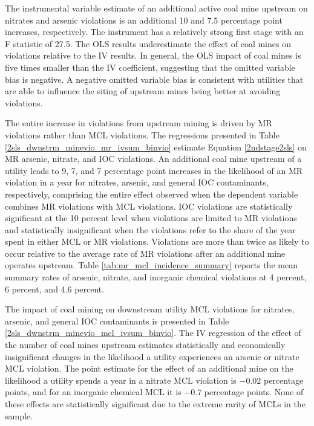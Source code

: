 \documentclass[12pt]{article}
\begin{document}
The instrumental variable estimate of an additional active coal mine upstream on nitrates and arsenic violations is an additional 10 and 7.5 percentage point increases, respectively. The instrument has a relatively strong first stage with an F statistic of 27.5. The OLS results underestimate the effect of coal mines on violations relative to the IV results. In general, the OLS impact of coal mines is five times smaller than the IV coefficient, suggesting that the omitted variable bias is negative. A negative omitted variable bias is consistent with utilities that are able to influence the siting of upstream mines being better at avoiding violations.

The entire increase in violations from upstream mining is driven by MR violations rather than MCL violations. The regressions presented in Table \ref{2sls_dwnstrm_minevio_mr_ivsum_binvio} estimate Equation \ref{2ndstage2sls} on MR arsenic, nitrate, and IOC violations. An additional coal mine upstream of a utility leads to 9, 7, and 7 percentage point increases in the likelihood of an MR violation in a year for nitrates, arsenic, and general IOC contaminants, respectively, comprising the entire effect observed when the dependent variable combines MR violations with MCL violations. IOC violations are statistically significant at the 10 percent level when violations are limited to MR violations and statistically insignificant when the violations refer to the share of the year spent in either MCL or MR violations. Violations are more than twice as likely to occur relative to the average rate of MR violations after an additional mine operates upstream. Table \ref{tab:mr_mcl_incidence_summary} reports the mean summary rates of arsenic, nitrate, and inorganic chemical violations at 4 percent, 6 percent, and 4.6 percent.

The impact of coal mining on downstream utility MCL violations for nitrates, arsenic, and general IOC contaminants is presented in Table \ref{2sls_dwnstrm_minevio_mcl_ivsum_binvio}. The IV regression of the effect of the number of coal mines upstream estimates statistically and economically insignificant changes in the likelihood a utility experiences an arsenic or nitrate MCL violation. The point estimate for the effect of an additional mine on the likelihood a utility spends a year in a nitrate MCL violation is $-0.02$ percentage points, and for an inorganic chemical MCL it is $-0.7$ percentage points. None of these effects are statistically significant due to the extreme rarity of MCLs in the sample.
\end{document}
